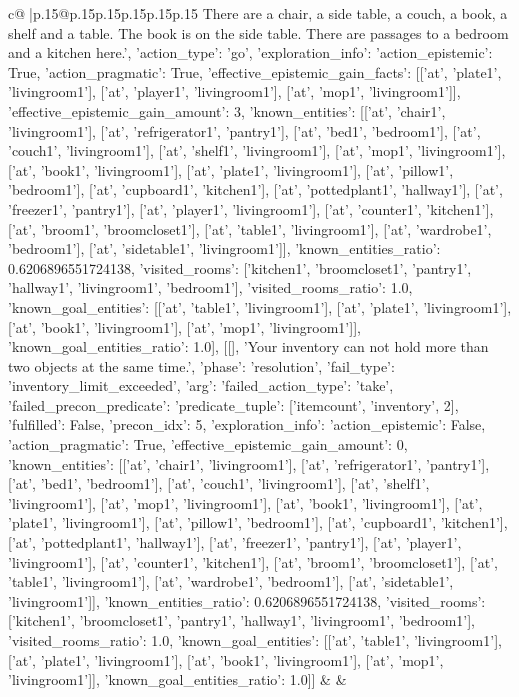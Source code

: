 \documentclass{article}
\begin{document}
{\begin{supertabular}{c@{$\;$}|p{.15\linewidth}@{}p{.15\linewidth}p{.15\linewidth}p{.15\linewidth}p{.15\linewidth}p{.15\linewidth}}
{{{There are a chair, a side table, a couch, a book, a shelf and a table. The book is on the side table. There are passages to a bedroom and a kitchen here.', {'action_type': 'go', 'exploration_info': {'action_epistemic': True, 'action_pragmatic': True, 'effective_epistemic_gain_facts': [['at', 'plate1', 'livingroom1'], ['at', 'player1', 'livingroom1'], ['at', 'mop1', 'livingroom1']], 'effective_epistemic_gain_amount': 3, 'known_entities': [['at', 'chair1', 'livingroom1'], ['at', 'refrigerator1', 'pantry1'], ['at', 'bed1', 'bedroom1'], ['at', 'couch1', 'livingroom1'], ['at', 'shelf1', 'livingroom1'], ['at', 'mop1', 'livingroom1'], ['at', 'book1', 'livingroom1'], ['at', 'plate1', 'livingroom1'], ['at', 'pillow1', 'bedroom1'], ['at', 'cupboard1', 'kitchen1'], ['at', 'pottedplant1', 'hallway1'], ['at', 'freezer1', 'pantry1'], ['at', 'player1', 'livingroom1'], ['at', 'counter1', 'kitchen1'], ['at', 'broom1', 'broomcloset1'], ['at', 'table1', 'livingroom1'], ['at', 'wardrobe1', 'bedroom1'], ['at', 'sidetable1', 'livingroom1']], 'known_entities_ratio': 0.6206896551724138, 'visited_rooms': ['kitchen1', 'broomcloset1', 'pantry1', 'hallway1', 'livingroom1', 'bedroom1'], 'visited_rooms_ratio': 1.0, 'known_goal_entities': [['at', 'table1', 'livingroom1'], ['at', 'plate1', 'livingroom1'], ['at', 'book1', 'livingroom1'], ['at', 'mop1', 'livingroom1']], 'known_goal_entities_ratio': 1.0}}], [[], 'Your inventory can not hold more than two objects at the same time.', {'phase': 'resolution', 'fail_type': 'inventory_limit_exceeded', 'arg': {'failed_action_type': 'take', 'failed_precon_predicate': {'predicate_tuple': ['itemcount', 'inventory', 2], 'fulfilled': False, 'precon_idx': 5}}, 'exploration_info': {'action_epistemic': False, 'action_pragmatic': True, 'effective_epistemic_gain_amount': 0, 'known_entities': [['at', 'chair1', 'livingroom1'], ['at', 'refrigerator1', 'pantry1'], ['at', 'bed1', 'bedroom1'], ['at', 'couch1', 'livingroom1'], ['at', 'shelf1', 'livingroom1'], ['at', 'mop1', 'livingroom1'], ['at', 'book1', 'livingroom1'], ['at', 'plate1', 'livingroom1'], ['at', 'pillow1', 'bedroom1'], ['at', 'cupboard1', 'kitchen1'], ['at', 'pottedplant1', 'hallway1'], ['at', 'freezer1', 'pantry1'], ['at', 'player1', 'livingroom1'], ['at', 'counter1', 'kitchen1'], ['at', 'broom1', 'broomcloset1'], ['at', 'table1', 'livingroom1'], ['at', 'wardrobe1', 'bedroom1'], ['at', 'sidetable1', 'livingroom1']], 'known_entities_ratio': 0.6206896551724138, 'visited_rooms': ['kitchen1', 'broomcloset1', 'pantry1', 'hallway1', 'livingroom1', 'bedroom1'], 'visited_rooms_ratio': 1.0, 'known_goal_entities': [['at', 'table1', 'livingroom1'], ['at', 'plate1', 'livingroom1'], ['at', 'book1', 'livingroom1'], ['at', 'mop1', 'livingroom1']], 'known_goal_entities_ratio': 1.0}}]] 
	  } 
	   } 
	   } 
	 & & \\ 
 


\end{supertabular}}
\end{document}
